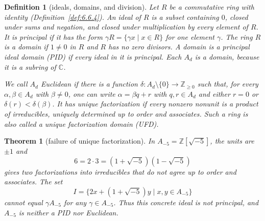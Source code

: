 \documentclass[11pt]{article}
\theoremstyle{ntstyle}
\newtheorem{theorem}{Theorem}[subsection]
\newtheorem{definition}{Definition}[subsection]
\begin{document}
\begin{definition}[ideals, domains, and division]\label{def:8.7.2}
	Let $R$ be a commutative ring with identity
	(Definition~\ref{def:6.6.4}). An ideal of $R$ is a subset containing
	$0$, closed under sums and negation, and closed under multiplication
	by every element of $R$. It is principal if it has the form
	$\gamma R=\{\gamma x\mid x\in R\}$ for one element $\gamma$.
	The ring $R$ is a domain if $1\neq0$ in $R$ and $R$ has no zero
	divisors. A domain is a principal ideal domain (PID) if every ideal
	in it is principal. Each $A_d$ is a domain, because it is a subring
	of $\mathbb{C}$.

	We call $A_d$ Euclidean if there is a function
	$\delta:A_d\setminus\{0\}\to\mathbb{Z}_{\ge0}$ such that, for
	every $\alpha,\beta\in A_d$ with $\beta\neq0$, one can write
	$\alpha=\beta q+r$ with $q,r\in A_d$ and either $r=0$ or
	$\delta(r)<\delta(\beta)$.
	It has unique factorization if every nonzero nonunit is a product
	of irreducibles, uniquely determined up to order and associates. Such a ring
	is also called a unique factorization domain (UFD).

\end{definition}

\begin{theorem}[failure of unique factorization]\label{thm:8.7.2}
	In $A_{-5}=\mathbb{Z}[\sqrt{-5}]$, the units are $\pm1$ and
	\[
		6=2\cdot3=(1+\sqrt{-5})(1-\sqrt{-5})
	\]
	gives two factorizations into irreducibles that do not agree up to
	order and associates. The set
	\[
		I=\{2x+(1+\sqrt{-5})y\mid x,y\in A_{-5}\}
	\]
	cannot equal $\gamma A_{-5}$ for any $\gamma\in A_{-5}$.
	Thus this concrete ideal is not principal, and $A_{-5}$ is neither
	a PID nor Euclidean.

\end{theorem}
\end{document}

